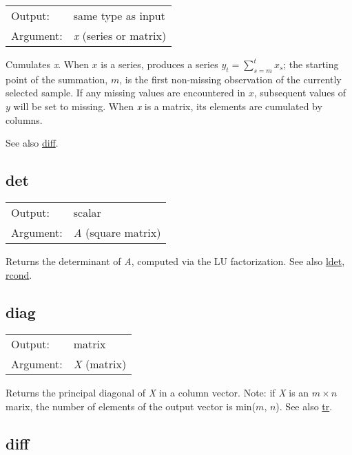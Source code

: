 \begin{tabular}{ll}
Output:     & same type as input\\
Argument:   & \textsl{x} (series or matrix)\\
\end{tabular}

	  Cumulates \textsl{x}. When \ensuremath{x} is a series,
	  produces a series $y_t = \sum_{s=m}^t x_s$; the starting point of
	  the summation, \ensuremath{m}, is the first non-missing observation
	  of the currently selected sample.  If any missing values are
	  encountered in \ensuremath{x}, subsequent values of \ensuremath{y}
	  will be set to missing. When \textsl{x} is a matrix, its
	  elements are cumulated by columns.

	  See also \hyperlink{func-diff}{diff}.

\subsection{det}
\hypertarget{func-det}{}

\begin{tabular}{ll}
Output:     & scalar\\
Argument:   & \textsl{A} (square matrix)\\
\end{tabular}

	  Returns the determinant of \textsl{A}, computed via the
	  LU factorization.
	  See also \hyperlink{func-ldet}{ldet}, \hyperlink{func-rcond}{rcond}.

\subsection{diag}
\hypertarget{func-diag}{}

\begin{tabular}{ll}
Output:     & matrix\\
Argument:   & \textsl{X} (matrix)\\
\end{tabular}

	  Returns the principal diagonal of \textsl{X} in a
	  column vector. Note: if \textsl{X} is an
	  \ensuremath{m\times n} marix, the number of elements
	  of the output vector is min(\ensuremath{m}, \ensuremath{n}).
	  See also \hyperlink{func-tr}{tr}.

\subsection{diff}
\hypertarget{func-diff}{}


